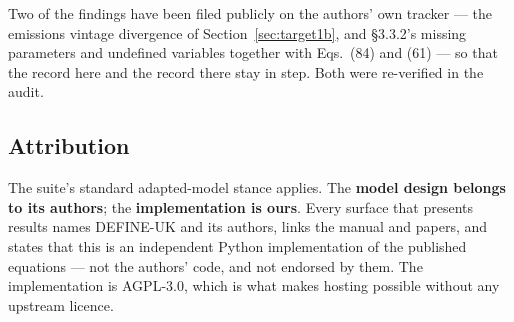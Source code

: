 Two of the findings have been filed publicly on the authors' own tracker --- the emissions vintage divergence of Section~\ref{sec:target1b}, and \S3.3.2's missing parameters and undefined variables together with Eqs.~(84) and (61) --- so that the record here and the record there stay in step. Both were re-verified in the audit.

\subsection{Attribution}

The suite's standard adapted-model stance applies. The \textbf{model design belongs to its authors}; the \textbf{implementation is ours}. Every surface that presents results names DEFINE-UK and its authors, links the manual and papers, and states that this is an independent Python implementation of the published equations --- not the authors' code, and not endorsed by them. The implementation is AGPL-3.0, which is what makes hosting possible without any upstream licence.
